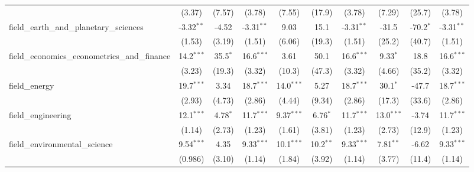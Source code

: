 \begin{tabular}{lccccccccc}
                                                               & (3.37)        & (7.57)        & (3.78)        & (7.55)        & (17.9)        & (3.78)        & (7.29)        & (25.7)        & (3.78)\\   
   field\_earth\_and\_planetary\_sciences                      & -3.32$^{**}$  & -4.52         & -3.31$^{**}$  & 9.03          & 15.1          & -3.31$^{**}$  & -31.5         & -70.2$^{*}$   & -3.31$^{**}$\\   
                                                               & (1.53)        & (3.19)        & (1.51)        & (6.06)        & (19.3)        & (1.51)        & (25.2)        & (40.7)        & (1.51)\\   
   field\_economics\_econometrics\_and\_finance                & 14.2$^{***}$  & 35.5$^{*}$    & 16.6$^{***}$  & 3.61          & 50.1          & 16.6$^{***}$  & 9.33$^{*}$    & 18.8          & 16.6$^{***}$\\   
                                                               & (3.23)        & (19.3)        & (3.32)        & (10.3)        & (47.3)        & (3.32)        & (4.66)        & (35.2)        & (3.32)\\   
   field\_energy                                               & 19.7$^{***}$  & 3.34          & 18.7$^{***}$  & 14.0$^{***}$  & 5.27          & 18.7$^{***}$  & 30.1$^{*}$    & -47.7         & 18.7$^{***}$\\   
                                                               & (2.93)        & (4.73)        & (2.86)        & (4.44)        & (9.34)        & (2.86)        & (17.3)        & (33.6)        & (2.86)\\   
   field\_engineering                                          & 12.1$^{***}$  & 4.78$^{*}$    & 11.7$^{***}$  & 9.37$^{***}$  & 6.76$^{*}$    & 11.7$^{***}$  & 13.0$^{***}$  & -3.74         & 11.7$^{***}$\\   
                                                               & (1.14)        & (2.73)        & (1.23)        & (1.61)        & (3.81)        & (1.23)        & (2.73)        & (12.9)        & (1.23)\\   
   field\_environmental\_science                               & 9.54$^{***}$  & 4.35          & 9.33$^{***}$  & 10.1$^{***}$  & 10.2$^{**}$   & 9.33$^{***}$  & 7.81$^{**}$   & -6.62         & 9.33$^{***}$\\   
                                                               & (0.986)       & (3.10)        & (1.14)        & (1.84)        & (3.92)        & (1.14)        & (3.77)        & (11.4)        & (1.14)\\   

\end{tabular}
